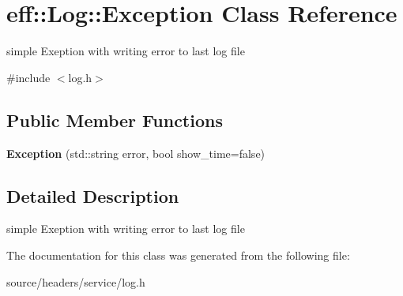 \hypertarget{classeff_1_1Log_1_1Exception}{}\section{eff\+:\+:Log\+:\+:Exception Class Reference}
\label{classeff_1_1Log_1_1Exception}


simple Exeption with writing error to last log file  




{\ttfamily \#include $<$log.\+h$>$}

\subsection*{Public Member Functions}
\begin{DoxyCompactItemize}
\item 
\mbox{\label{classeff_1_1Log_1_1Exception_ac64d9685bff912e35028e1a8cdeec026}} 
{\bfseries Exception} (std\+::string error, bool show\+\_\+time=false)
\end{DoxyCompactItemize}


\subsection{Detailed Description}
simple Exeption with writing error to last log file 

The documentation for this class was generated from the following file\+:\begin{DoxyCompactItemize}
\item 
source/headers/service/log.\+h\end{DoxyCompactItemize}
